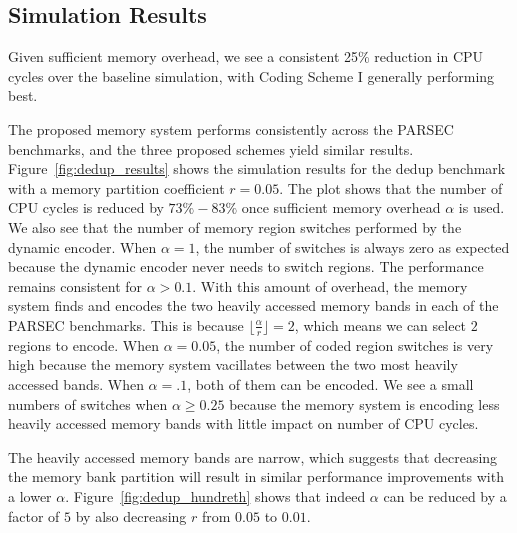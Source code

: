 \subsection{Simulation Results}
\label{sec:simulation}

Given sufficient memory overhead, we see a consistent 25\% reduction in CPU cycles over the baseline simulation, with Coding Scheme I generally performing best. 


The proposed memory system performs consistently across the PARSEC benchmarks, and the three proposed schemes yield similar results. Figure~\ref{fig:dedup_results} shows the simulation results for the dedup benchmark with a memory partition coefficient $r = 0.05$. The plot shows that the number of CPU cycles is reduced by $73\%-83\%$ once sufficient memory overhead $\alpha$ is used. 
We also see that the number of memory region switches performed by the dynamic encoder. When $\alpha = 1$, the number of switches is always zero as expected because the dynamic encoder never needs to switch regions. The performance remains consistent for $\alpha > 0.1$. With this amount of overhead, the memory system finds and encodes the two heavily accessed memory bands in each of the PARSEC benchmarks. This is because $\lfloor\frac{\alpha}{r}\rfloor = 2$, which means we can select $2$ regions to encode. 
When $\alpha = 0.05$, the number of coded region switches is very high because the memory system vacillates between the two most heavily accessed bands. When $\alpha = .1$, both of them can be encoded. We see a small numbers of switches when $\alpha \geq 0.25$ because the memory system is encoding less heavily accessed memory bands with little impact on number of CPU cycles.


The heavily accessed memory bands are narrow, which suggests that decreasing the memory bank partition will result in similar performance improvements with a lower $\alpha$. Figure~\ref{fig:dedup_hundreth} shows that indeed $\alpha$ can be reduced by a factor of $5$ by also decreasing $r$ from $0.05$ to $0.01$.


